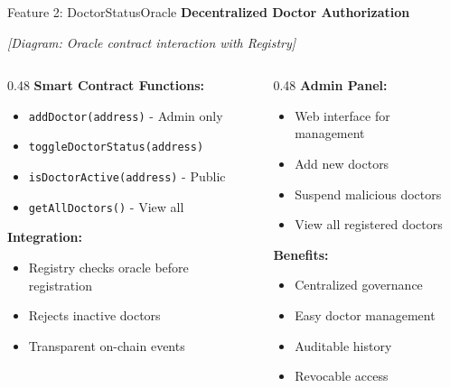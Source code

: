 \documentclass[10pt]{beamer}
\begin{document}
\begin{frame}{Feature 2: DoctorStatusOracle}
\textbf{Decentralized Doctor Authorization}

\vspace{0.2cm}
\begin{center}
\textit{[Diagram: Oracle contract interaction with Registry]}
\end{center}

\vspace{0.2cm}
\begin{columns}[T]
\begin{column}{0.48\textwidth}
\textbf{Smart Contract Functions:}
\begin{itemize}
\item \texttt{addDoctor(address)} - Admin only
\item \texttt{toggleDoctorStatus(address)}
\item \texttt{isDoctorActive(address)} - Public
\item \texttt{getAllDoctors()} - View all
\end{itemize}

\textbf{Integration:}
\begin{itemize}
\item Registry checks oracle before registration
\item Rejects inactive doctors
\item Transparent on-chain events
\end{itemize}
\end{column}

\begin{column}{0.48\textwidth}
\textbf{Admin Panel:}
\begin{itemize}
\item Web interface for management
\item Add new doctors
\item Suspend malicious doctors
\item View all registered doctors
\end{itemize}

\textbf{Benefits:}
\begin{itemize}
\item Centralized governance
\item Easy doctor management
\item Auditable history
\item Revocable access
\end{itemize}
\end{column}
\end{columns}
\end{frame}
\end{document}
